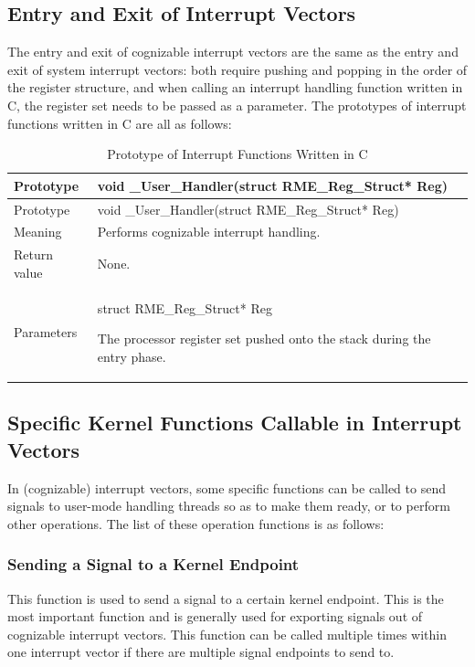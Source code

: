 \subsection{Entry and Exit of Interrupt Vectors}\label{subsec:7-interrupt-vector-entry-and-exit}

The entry and exit of cognizable interrupt vectors are the same as the entry and exit of system interrupt vectors: both require pushing and popping in the order of the register structure, and when calling an interrupt handling function written in C, the register set needs to be passed as a parameter. The prototypes of interrupt functions written in C are all as follows:

\begin{xltabular}{\textwidth}{@{}>{\hsize\raggedright\arraybackslash}X>{\hsize\raggedright\arraybackslash}X@{}}
\caption{Prototype of Interrupt Functions Written in C}\label{tab:7-24-c-interrupt-function-prototype}\\
\toprule
Prototype & void \_User\_Handler(struct RME\_Reg\_Struct* Reg)\tabularnewline
\endfirsthead
\toprule
Prototype & void \_User\_Handler(struct RME\_Reg\_Struct* Reg)\tabularnewline
\midrule
\endhead
\bottomrule
\endlastfoot
Meaning & Performs cognizable interrupt handling.\tabularnewline
Return value & None.\tabularnewline
Parameters\strut
 & struct RME\_Reg\_Struct* Reg

The processor register set pushed onto the stack during the entry phase.\strut
\tabularnewline
\end{xltabular}
\nopagebreak[4]

\subsection{Specific Kernel Functions Callable in Interrupt Vectors}\label{subsec:7-specific-kernel-functions-in-interrupt-vectors}

In (cognizable) interrupt vectors, some specific functions can be called to send signals to user-mode handling threads so as to make them ready, or to perform other operations. The list of these operation functions is as follows:

\subsubsection{Sending a Signal to a Kernel Endpoint}\label{subsubsec:7-send-signal-to-kernel-endpoint}

This function is used to send a signal to a certain kernel endpoint. This is the most important function and is generally used for exporting signals out of cognizable interrupt vectors. This function can be called multiple times within one interrupt vector if there are multiple signal endpoints to send to.

